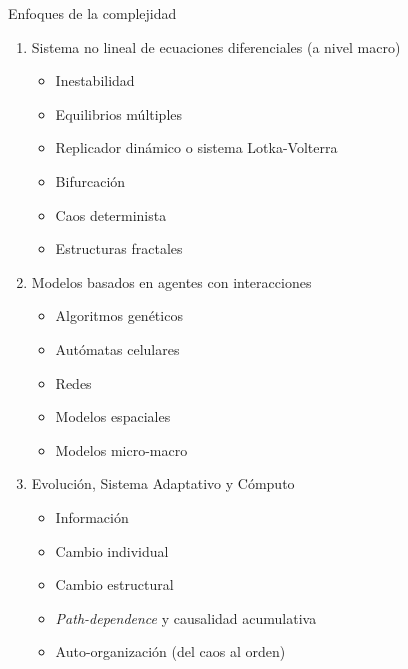 \documentclass[11pt]{beamer}
\begin{document}
\begin{frame}
\begin{frame}{Enfoques de la complejidad}
\begin{enumerate}
\item \small Sistema no lineal de ecuaciones diferenciales (a nivel macro)
\begin{itemize}
 \footnotesize   \item Inestabilidad 
 \item Equilibrios múltiples 
 \item Replicador dinámico o sistema Lotka-Volterra 
 \item Bifurcación 
 \item Caos determinista 
 \item Estructuras fractales
\end{itemize}
\item Modelos basados en agentes con interacciones
\begin{itemize}
\footnotesize    \item Algoritmos genéticos
     \item Autómatas celulares
     \item Redes
     \item Modelos espaciales
     \item Modelos micro-macro 
\end{itemize}
\item Evolución, Sistema Adaptativo y Cómputo
\begin{itemize}
\footnotesize    \item Información
     \item Cambio individual
     \item Cambio estructural
     \item \textit{Path-dependence} y causalidad acumulativa
     \item Auto-organización (del caos al orden)
\end{itemize}
\end{enumerate}
\end{frame}


\end{frame}
\end{document}
